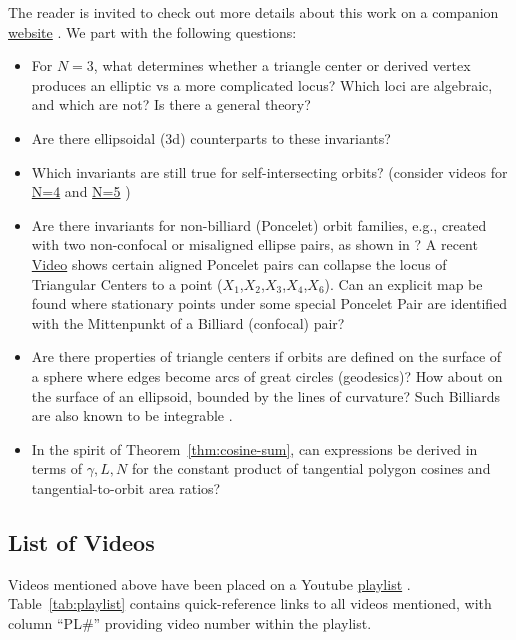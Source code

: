 
The reader is invited to check out more details about this work on a companion \href{https://dan-reznik.github.io/Elliptical-Billiards-Triangular-Orbits/}{website} \cite{reznik_web}. We part with the following questions:

\begin{itemize}
    \item For $N=3$, what determines whether a triangle center or derived vertex produces an elliptic vs a more complicated locus? Which loci are algebraic, and which are not? Is there a general theory?
    \item Are there ellipsoidal (3d) counterparts to these invariants?
    \item Which invariants are still true for self-intersecting orbits? (consider videos for \href{https://youtu.be/cCYxN7ueGV4}{N=4} and \href{https://youtu.be/ECe4DptduJY}{N=5} \cite[pl\#3,4]{dsr_math_intell_playlist})
    \item Are there invariants for non-billiard (Poncelet) orbit families, e.g., created with two non-confocal or misaligned ellipse pairs, as shown in \cite{sergei2016}? A recent \href{https://youtu.be/B5dRXT8Xerw}{Video} \cite[pl\#22]{dsr_math_intell_playlist} shows certain aligned Poncelet pairs can collapse the locus of Triangular Centers to a point ($X_1$,$X_2$,$X_3$,$X_4$,$X_6$). Can an explicit map be found where stationary points under some special Poncelet Pair are identified with the Mittenpunkt of a Billiard (confocal) pair?
    \item Are there properties of triangle centers if orbits are defined on the surface of a sphere where edges become arcs of great circles (geodesics)? How about on the surface of an ellipsoid, bounded by the lines of curvature? Such Billiards are also known to be integrable \cite{sergei2002}.
    \item In the spirit of Theorem~\ref{thm:cosine-sum}, can expressions be derived in terms of $\gamma,L,N$ for the constant product of tangential polygon cosines and tangential-to-orbit area ratios? 
\end{itemize}

\subsection{List of Videos}
\label{sec:list-videos}

Videos mentioned above have been placed on a Youtube \href{https://bit.ly/2kTvPPr}{playlist} \cite{dsr_math_intell_playlist}.  Table~\ref{tab:playlist} contains quick-reference links to all videos mentioned, with column ``PL\#'' providing video number within the playlist.

